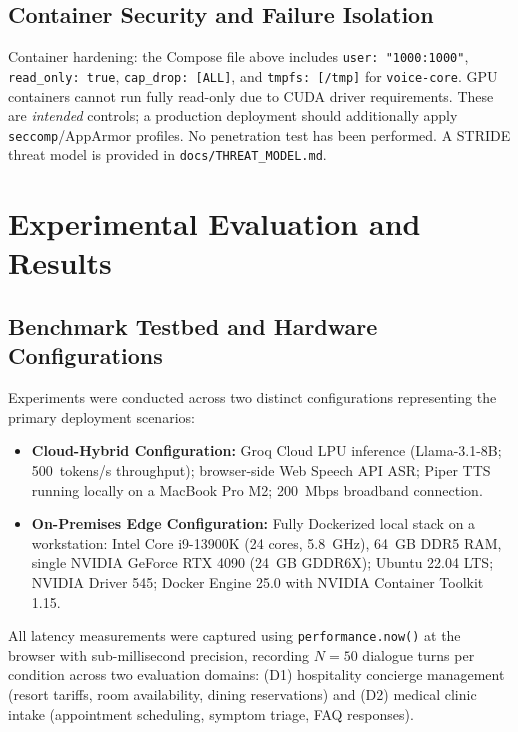 \documentclass[11pt,a4paper]{article}
\begin{document}
\subsection{Container Security and Failure Isolation}
\label{subsec:docker_security}

Container hardening: the Compose file above includes \texttt{user: "1000:1000"}, \texttt{read\_only: true}, \texttt{cap\_drop: [ALL]}, and \texttt{tmpfs: [/tmp]} for \texttt{voice-core}. GPU containers cannot run fully read-only due to CUDA driver requirements. These are \textit{intended} controls; a production deployment should additionally apply \texttt{seccomp}/AppArmor profiles. No penetration test has been performed. A STRIDE threat model is provided in \texttt{docs/THREAT\_MODEL.md}.


\section{Experimental Evaluation and Results}
\label{sec:evaluation}

\subsection{Benchmark Testbed and Hardware Configurations}
\label{subsec:eval_setup}

Experiments were conducted across two distinct configurations representing the primary deployment scenarios:

\begin{itemize}[leftmargin=*]
    \item \textbf{Cloud-Hybrid Configuration:} Groq Cloud LPU inference (Llama-3.1-8B; 500~tokens/s throughput); browser-side Web Speech API ASR; Piper TTS running locally on a MacBook Pro M2; 200~Mbps broadband connection.
    \item \textbf{On-Premises Edge Configuration:} Fully Dockerized local stack on a workstation: Intel Core i9-13900K (24 cores, 5.8~GHz), 64~GB DDR5 RAM, single NVIDIA GeForce RTX 4090 (24~GB GDDR6X); Ubuntu 22.04 LTS; NVIDIA Driver 545; Docker Engine 25.0 with NVIDIA Container Toolkit 1.15.
\end{itemize}

All latency measurements were captured using \texttt{performance.now()} at the browser with sub-millisecond precision, recording $N=50$ dialogue turns per condition across two evaluation domains: (D1) hospitality concierge management (resort tariffs, room availability, dining reservations) and (D2) medical clinic intake (appointment scheduling, symptom triage, FAQ responses).
\end{document}
